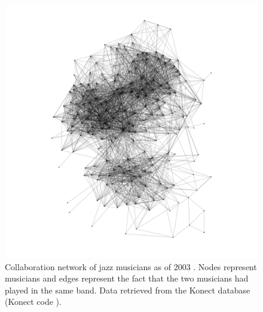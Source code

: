 \documentclass[
11pt, %
english, %
singlespacing, %
nolistspacing, %
liststotoc, %
headsepline, %
]{MastersDoctoralThesis} %
\begin{document}
\begin{figure}
	\includegraphics[width=\textwidth]{network-arenas-jazz.pdf}
	\caption{Collaboration network of jazz musicians as of 2003 \cite{gleiser2003community}. Nodes represent musicians and edges represent the fact that the two musicians had played in the same band. Data retrieved from the Konect database \cite{kunegis2013konect} (Konect code ).}
	\label{Figure: Network of jazz musicians collaborations}
\end{figure}
\end{document}
